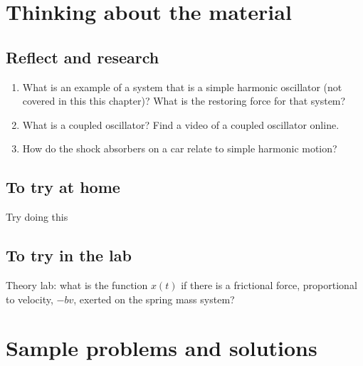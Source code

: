\newpage
\section{Thinking about the material}
\subsection{Reflect and research}
\begin{enumerate}
\item What is an example of a system that is a simple harmonic oscillator (not covered in this this chapter)? What is the restoring force for that system?
\item What is a coupled oscillator? Find a video of a coupled oscillator online.
\item How do the shock absorbers on a car relate to simple harmonic motion?
\end{enumerate}
\subsection{To try at home}

\begin{tQuestion}Try doing this \end{tQuestion}

\subsection{To try in the lab}
Theory lab: what is the function $x(t)$ if there is a frictional force, proportional to velocity, $-bv$, exerted on the spring mass system?
\newpage
\section{Sample problems and solutions}
